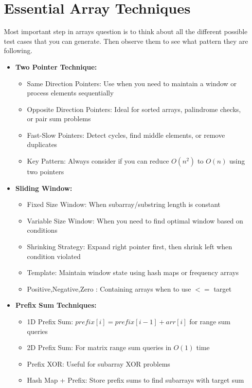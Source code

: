 \documentclass[a4paper,10pt]{book}
\begin{document}
\chapter{Essential Array Techniques  }
\label{sec:arrays}
Most important step in arrays question is to think about all the different possible test cases that you can generate. Then observe them to see what pattern they are following.
\begin{itemize}[leftmargin=*]
    \item \textbf{Two Pointer Technique:}
    \begin{itemize}
        \item Same Direction Pointers: Use when you need to maintain a window or process elements sequentially
        \item Opposite Direction Pointers: Ideal for sorted arrays, palindrome checks, or pair sum problems
        \item Fast-Slow Pointers: Detect cycles, find middle elements, or remove duplicates
        \item Key Pattern: Always consider if you can reduce $O(n^2)$ to $O(n)$ using two pointers
    \end{itemize}
    
    \item \textbf{Sliding Window:}
    \begin{itemize}
        \item Fixed Size Window: When subarray/substring length is constant
        \item Variable Size Window: When you need to find optimal window based on conditions
        \item Shrinking Strategy: Expand right pointer first, then shrink left when condition violated
        \item Template: Maintain window state using hash maps or frequency arrays
        \item Positive,Negative,Zero : Containing arrays when to use $<=$ target
    \end{itemize}
    
    \item \textbf{Prefix Sum Techniques:}
    \begin{itemize}
        \item 1D Prefix Sum: $prefix[i] = prefix[i-1] + arr[i]$ for range sum queries
        \item 2D Prefix Sum: For matrix range sum queries in $O(1)$ time
        \item Prefix XOR: Useful for subarray XOR problems
        \item Hash Map + Prefix: Store prefix sums to find subarrays with target sum
    \end{itemize}
\end{itemize}
\end{document}
